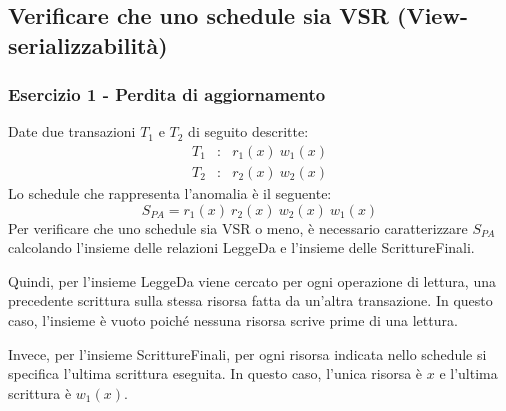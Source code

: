 \documentclass[a4paper]{article}
\begin{document}
	\subsection{Verificare che uno schedule sia VSR (View-serializzabilità)}
	
	\subsubsection{Esercizio 1 - Perdita di aggiornamento}
	
	Date due transazioni $T_{1}$ e $T_{2}$ di seguito descritte:
	\begin{equation*}
		\begin{array}{lll}
			T_{1} &:& r_{1}\left(x\right) \: w_{1}\left(x\right) \\
			T_{2} &:& r_{2}\left(x\right) \: w_{2}\left(x\right)
		\end{array}
	\end{equation*}
	Lo schedule che rappresenta l'anomalia è il seguente:
	\begin{equation*}
		S_{PA} = r_{1}\left(x\right) \: r_{2}\left(x\right) \: w_{2}\left(x\right) \: w_{1}\left(x\right)
	\end{equation*}
	Per verificare che uno schedule sia VSR o meno, è necessario caratterizzare $S_{PA}$ calcolando l'insieme delle relazioni LeggeDa e l'insieme delle ScrittureFinali.\newline
	
	\noindent
	Quindi, per l'insieme LeggeDa viene cercato per ogni operazione di lettura, una precedente scrittura sulla stessa risorsa fatta da un'altra transazione. In questo caso, l'insieme è vuoto poiché nessuna risorsa scrive prime di una lettura.\newline
	
	\noindent
	Invece, per l'insieme ScrittureFinali, per ogni risorsa indicata nello schedule si specifica l'ultima scrittura eseguita. In questo caso, l'unica risorsa è $x$ e l'ultima scrittura è $w_{1}\left(x\right)$.\newline
	
\end{document}
